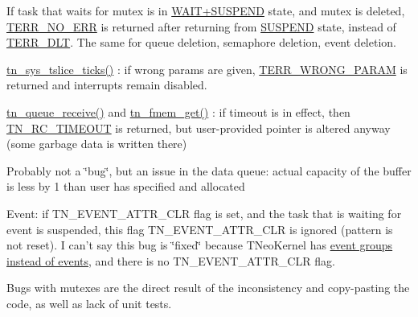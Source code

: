 \begin{DoxyItemize}
\item If task that waits for mutex is in \hyperlink{tn__tasks_8h_a5e12e8a0ab280b515f44bf3fee1210a6ad010070ccc16a5c706c286baf2e3ee2a}{{\ttfamily W\+A\+I\+T+\+S\+U\+S\+P\+E\+N\+D}} state, and mutex is deleted, {\ttfamily \hyperlink{tn__oldsymbols_8h_a71970f860643e62fad7ec03076bdc1d8}{T\+E\+R\+R\+\_\+\+N\+O\+\_\+\+E\+R\+R}} is returned after returning from \hyperlink{tn__tasks_8h_a5e12e8a0ab280b515f44bf3fee1210a6adcf21b28920038f38cccc50fda12ba58}{{\ttfamily S\+U\+S\+P\+E\+N\+D}} state, instead of {\ttfamily \hyperlink{tn__oldsymbols_8h_ae6a83c118d209d8702c3fc40d58ea18f}{T\+E\+R\+R\+\_\+\+D\+L\+T}}. The same for queue deletion, semaphore deletion, event deletion.
\item {\ttfamily \hyperlink{tn__oldsymbols_8h_a74b0cfd9bbf5a85f4e0d00a984f60f5e}{tn\+\_\+sys\+\_\+tslice\+\_\+ticks()}} \+: if wrong params are given, {\ttfamily \hyperlink{tn__oldsymbols_8h_a35ec519d54f884d84c5814f49f00a22b}{T\+E\+R\+R\+\_\+\+W\+R\+O\+N\+G\+\_\+\+P\+A\+R\+A\+M}} is returned and interrupts remain disabled.
\item {\ttfamily \hyperlink{tn__dqueue_8h_a589bfb4d3966bc7405dcf959d7114544}{tn\+\_\+queue\+\_\+receive()}} and {\ttfamily \hyperlink{tn__fmem_8h_afb45a1f427b531b22f1f4b013f415ae0}{tn\+\_\+fmem\+\_\+get()}} \+: if {\ttfamily timeout} is in effect, then {\ttfamily \hyperlink{tn__common_8h_aa43bd3da1ad4c1e61224b5f23b369876a5b4d73fde6b5d1c9579c02e6aafce1fb}{T\+N\+\_\+\+R\+C\+\_\+\+T\+I\+M\+E\+O\+U\+T}} is returned, but user-\/provided pointer is altered anyway (some garbage data is written there)
\item Probably not a \char`\"{}bug\char`\"{}, but an issue in the data queue\+: actual capacity of the buffer is less by 1 than user has specified and allocated
\item Event\+: if {\ttfamily T\+N\+\_\+\+E\+V\+E\+N\+T\+\_\+\+A\+T\+T\+R\+\_\+\+C\+L\+R} flag is set, and the task that is waiting for event is suspended, this flag {\ttfamily T\+N\+\_\+\+E\+V\+E\+N\+T\+\_\+\+A\+T\+T\+R\+\_\+\+C\+L\+R} is ignored (pattern is not reset). I can't say this bug is \char`\"{}fixed\char`\"{} because T\+Neo\+Kernel has \hyperlink{tnkernel_diff_tnkernel_diff_event}{event groups instead of events}, and there is no {\ttfamily T\+N\+\_\+\+E\+V\+E\+N\+T\+\_\+\+A\+T\+T\+R\+\_\+\+C\+L\+R} flag.
\end{DoxyItemize}

Bugs with mutexes are the direct result of the inconsistency and copy-\/pasting the code, as well as lack of unit tests. 